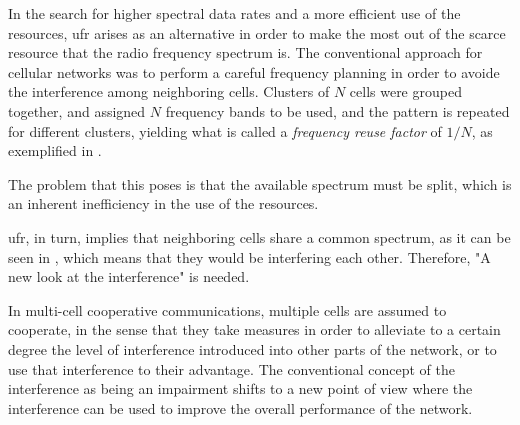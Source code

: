 In the search for higher spectral data rates and a more efficient use of the
resources, \gls{ufr} arises as an alternative in order to make the most out of
the scarce resource that the radio frequency spectrum is. The conventional approach
for cellular networks was to perform a careful frequency planning in order to
avoide the interference among neighboring cells. Clusters of $N$ cells were grouped
together, and assigned $N$ frequency bands to be used, and the pattern is repeated
for different clusters, yielding what is called a \emph{frequency reuse factor}
of $1 / N$, as exemplified in .

The problem that this poses is that the available spectrum must be split, which
is an inherent inefficiency in the use of the resources.

\gls{ufr}, in turn, implies that neighboring cells share a common spectrum, as it
can be seen in , which means that they would be interfering each
other. Therefore, "A new look at the interference" \citep{gesbert10} is needed.

In multi-cell cooperative communications, multiple cells are assumed to cooperate,
in the sense that they take measures in order to alleviate to a certain degree the
level of interference introduced into other parts of the network, or to use that
interference to their advantage. The conventional concept of the interference as
being an impairment shifts to a new point of view where the interference can be
used to improve the overall performance of the network.
